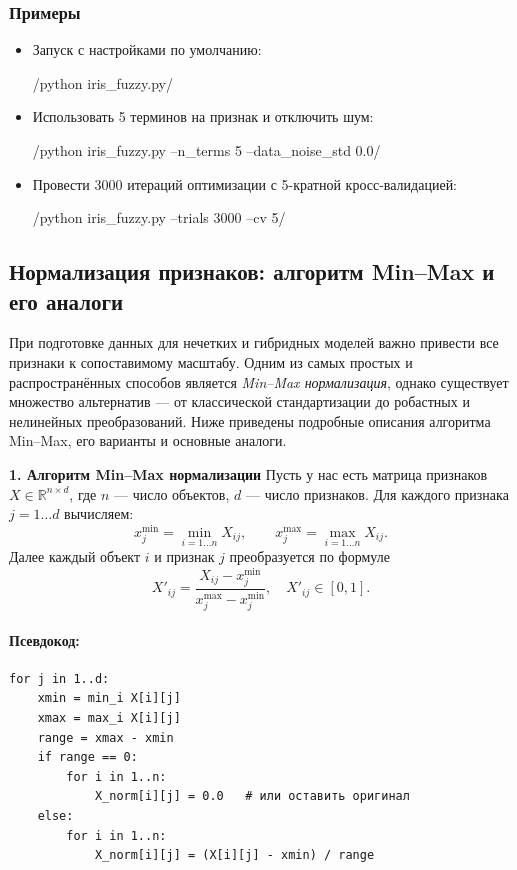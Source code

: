 \subsubsection{Примеры}
\begin{itemize}
  \item Запуск с настройками по умолчанию:
    
    /python iris_fuzzy.py/

  \item Использовать 5 терминов на признак и отключить шум:
    
    /python iris_fuzzy.py --n_terms 5 --data_noise_std 0.0/

  \item Провести 3000 итераций оптимизации с 5-кратной кросс-валидацией:
    
    /python iris_fuzzy.py --trials 3000 --cv 5/
\end{itemize}

\subsection{Нормализация признаков: алгоритм Min–Max и его аналоги}

При подготовке данных для нечетких и гибридных моделей важно привести все признаки к сопоставимому масштабу. Одним из самых простых и распространённых способов является \emph{Min–Max нормализация}, однако существует множество альтернатив — от классической стандартизации до робастных и нелинейных преобразований. Ниже приведены подробные описания алгоритма Min–Max, его варианты и основные аналоги.

\medskip
\noindent\textbf{1. Алгоритм Min–Max нормализации}  
Пусть у нас есть матрица признаков \(X \in \mathbb{R}^{n\times d}\), где \(n\) — число объектов, \(d\) — число признаков. Для каждого признака \(j = 1\ldots d\) вычисляем:
\[
  x_j^{\min} = \min_{i=1\ldots n} X_{i j},\qquad
  x_j^{\max} = \max_{i=1\ldots n} X_{i j}.
\]
Далее каждый объект \(i\) и признак \(j\) преобразуется по формуле
\[
  X'_{i j}
  = \frac{X_{i j} - x_j^{\min}}{x_j^{\max} - x_j^{\min}},
  \quad X'_{i j} \in [0,1].
\]
\paragraph{Псевдокод:}
\begin{verbatim}
for j in 1..d:
    xmin = min_i X[i][j]
    xmax = max_i X[i][j]
    range = xmax - xmin
    if range == 0:
        for i in 1..n:
            X_norm[i][j] = 0.0   # или оставить оригинал
    else:
        for i in 1..n:
            X_norm[i][j] = (X[i][j] - xmin) / range
\end{verbatim}
